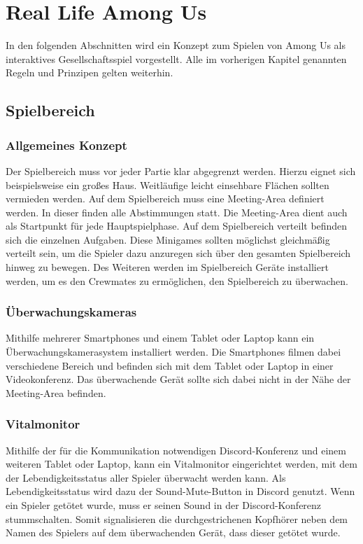 \section{Real Life Among Us}
In den folgenden Abschnitten wird ein Konzept zum Spielen von Among Us als
interaktives Gesellschaftsspiel vorgestellt. Alle im vorherigen Kapitel
genannten Regeln und Prinzipen gelten weiterhin.
\subsection{Spielbereich}
\subsubsection{Allgemeines Konzept}
Der Spielbereich muss vor jeder Partie klar abgegrenzt werden. Hierzu eignet
sich beispielsweise ein großes Haus. Weitläufige leicht einsehbare Flächen
sollten vermieden werden.
\newline
Auf dem Spielbereich muss eine Meeting-Area definiert werden. In dieser finden
alle Abstimmungen statt. Die Meeting-Area dient auch als Startpunkt für jede
Hauptspielphase.
\newline
Auf dem Spielbereich verteilt befinden sich die einzelnen Aufgaben. Diese
Minigames sollten möglichst gleichmäßig verteilt sein, um die Spieler dazu
anzuregen sich über den gesamten Spielbereich hinweg zu bewegen.
\newline
Des Weiteren werden im Spielbereich Geräte installiert werden, um es den
Crewmates zu ermöglichen, den Spielbereich zu überwachen.

\subsubsection{Überwachungskameras}
Mithilfe mehrerer Smartphones und einem Tablet oder Laptop kann ein
Überwachungskamerasystem installiert werden. Die Smartphones filmen dabei
verschiedene Bereich und befinden sich mit dem Tablet oder Laptop in einer
Videokonferenz. Das überwachende Gerät sollte sich dabei nicht in der Nähe
der Meeting-Area befinden.

\subsubsection{Vitalmonitor}
Mithilfe der für die Kommunikation notwendigen Discord-Konferenz und einem
weiteren Tablet oder Laptop, kann ein Vitalmonitor eingerichtet werden, mit dem
der Lebendigkeitsstatus aller Spieler überwacht werden kann. Als
Lebendigkeitsstatus wird dazu der Sound-Mute-Button in Discord genutzt.
Wenn ein Spieler getötet wurde, muss er seinen Sound in der Discord-Konferenz
stummschalten.
Somit signalisieren die durchgestrichenen Kopfhörer neben dem Namen des Spielers
auf dem überwachenden Gerät, dass dieser getötet wurde.

